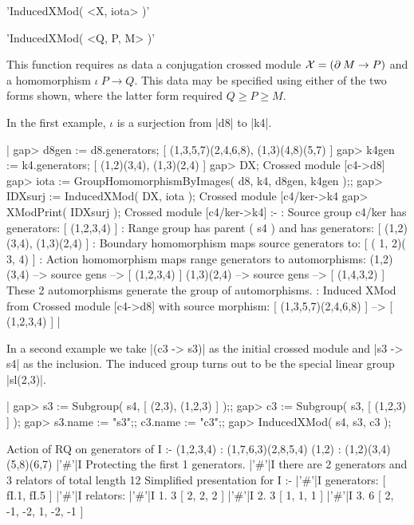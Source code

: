 {%
%

'InducedXMod( <X, iota> )'

'InducedXMod( <Q, P, M> )'

This function requires as data a conjugation crossed module
${\cal X} = (\partial \: M \to P)$ and a homomorphism
$\iota \: P \to Q$.
This data may be specified using either of the two forms shown,
where the latter form required  $Q \ge P \ge M$.

In the first example, $\iota$ is a surjection from |d8| to |k4|.

|    gap> d8gen := d8.generators;
    [ (1,3,5,7)(2,4,6,8), (1,3)(4,8)(5,7) ]
    gap> k4gen := k4.generators;
    [ (1,2)(3,4), (1,3)(2,4) ]
    gap> DX;
    Crossed module [c4->d8]
    gap> iota := GroupHomomorphismByImages( d8, k4, d8gen, k4gen );;
    gap> IDXsurj := InducedXMod( DX, iota );
    Crossed module [c4/ker->k4
    gap> XModPrint( IDXsurj );
    Crossed module [c4/ker->k4] :- 
    : Source group c4/ker has generators:
      [ (1,2,3,4) ]
    : Range group has parent ( s4 ) and has generators:
      [ (1,2)(3,4), (1,3)(2,4) ]
    : Boundary homomorphism maps source generators to:
      [ ( 1, 2)( 3, 4) ]
    : Action homomorphism maps range generators to automorphisms:
      (1,2)(3,4) --> { source gens --> [ (1,2,3,4) ] }
      (1,3)(2,4) --> { source gens --> [ (1,4,3,2) ] }
      These 2 automorphisms generate the group of automorphisms.
    : Induced XMod from Crossed module [c4->d8]  with source morphism:
      [ (1,3,5,7)(2,4,6,8) ]
       --> [ (1,2,3,4) ]    |

In a second example we take |(c3 -> s3)| as the initial crossed module
and |s3 -> s4| as the inclusion.  
The induced group turns out to be the special linear group |sl(2,3)|.

|    gap> s3 := Subgroup( s4, [ (2,3), (1,2,3) ] );;
    gap> c3 := Subgroup( s3, [ (1,2,3) ] );
    gap> s3.name := "s3";;  c3.name := "c3";;
    gap> InducedXMod( s4, s3, c3 );

    Action of RQ on generators of I :- 
      (1,2,3,4) : (1,7,6,3)(2,8,5,4)
      (1,2) : (1,2)(3,4)(5,8)(6,7)
    |'\#'|I  Protecting the first 1 generators.
    |'\#'|I  there are 2 generators and 3 relators of total length 12
    Simplified presentation for I :- 
    |'\#'|I  generators: [ fI.1, fI.5 ]
    |'\#'|I  relators:
    |'\#'|I  1.  3  [ 2, 2, 2 ]
    |'\#'|I  2.  3  [ 1, 1, 1 ]
    |'\#'|I  3.  6  [ 2, -1, -2, 1, -2, -1 ]

}
